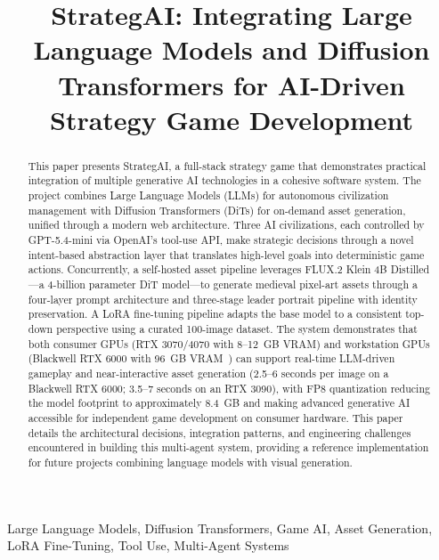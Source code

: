 \documentclass[conference]{IEEEtran}
\begin{document}
\title{StrategAI: Integrating Large Language Models and Diffusion Transformers for AI-Driven Strategy Game Development}

\author{
}

\maketitle

\begin{abstract}
This paper presents StrategAI, a full-stack strategy game that demonstrates practical integration of multiple generative AI technologies in a cohesive software system. The project combines Large Language Models (LLMs) for autonomous civilization management with Diffusion Transformers (DiTs) for on-demand asset generation, unified through a modern web architecture. Three AI civilizations, each controlled by GPT-5.4-mini via OpenAI's tool-use API, make strategic decisions through a novel intent-based abstraction layer that translates high-level goals into deterministic game actions. Concurrently, a self-hosted asset pipeline leverages FLUX.2 Klein 4B Distilled---a 4-billion parameter DiT model---to generate medieval pixel-art assets through a four-layer prompt architecture and three-stage leader portrait pipeline with identity preservation. A LoRA fine-tuning pipeline adapts the base model to a consistent top-down perspective using a curated 100-image dataset. The system demonstrates that both consumer GPUs (RTX 3070/4070 with 8--12~GB VRAM) and workstation GPUs (Blackwell RTX 6000 with 96~GB VRAM~\cite{nvidia2024blackwell}) can support real-time LLM-driven gameplay and near-interactive asset generation (2.5--6 seconds per image on a Blackwell RTX 6000; 3.5--7 seconds on an RTX 3090), with FP8 quantization reducing the model footprint to approximately 8.4~GB and making advanced generative AI accessible for independent game development on consumer hardware. This paper details the architectural decisions, integration patterns, and engineering challenges encountered in building this multi-agent system, providing a reference implementation for future projects combining language models with visual generation.
\end{abstract}

\begin{IEEEkeywords}
Large Language Models, Diffusion Transformers, Game AI, Asset Generation, LoRA Fine-Tuning, Tool Use, Multi-Agent Systems
\end{IEEEkeywords}
\end{document}
